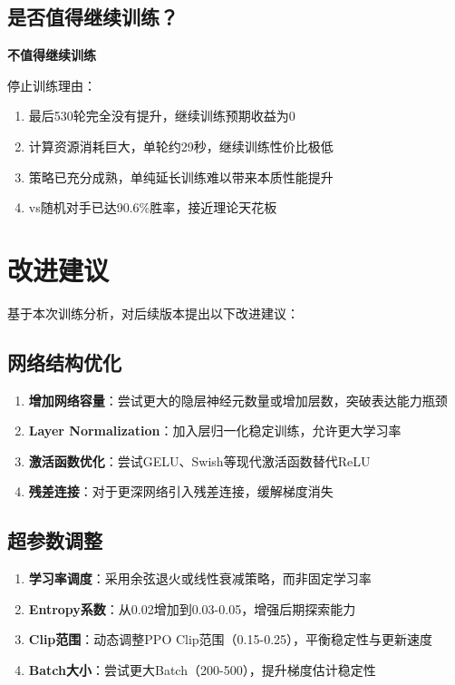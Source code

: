 \documentclass[12pt,a4paper]{article}
\begin{document}
\subsection{是否值得继续训练？}

\textcolor{danger}{\Huge \textbf{不值得继续训练}}

\vspace{0.5cm}

停止训练理由：
\begin{enumerate}
\item 最后530轮完全没有提升，继续训练预期收益为0
\item 计算资源消耗巨大，单轮约29秒，继续训练性价比极低
\item 策略已充分成熟，单纯延长训练难以带来本质性能提升
\item vs随机对手已达90.6\%胜率，接近理论天花板
\end{enumerate}

\newpage

\section{改进建议}

基于本次训练分析，对后续版本提出以下改进建议：

\subsection{网络结构优化}
\begin{enumerate}
\item \textbf{增加网络容量}：尝试更大的隐层神经元数量或增加层数，突破表达能力瓶颈
\item \textbf{Layer Normalization}：加入层归一化稳定训练，允许更大学习率
\item \textbf{激活函数优化}：尝试GELU、Swish等现代激活函数替代ReLU
\item \textbf{残差连接}：对于更深网络引入残差连接，缓解梯度消失
\end{enumerate}

\subsection{超参数调整}
\begin{enumerate}
\item \textbf{学习率调度}：采用余弦退火或线性衰减策略，而非固定学习率
\item \textbf{Entropy系数}：从0.02增加到0.03-0.05，增强后期探索能力
\item \textbf{Clip范围}：动态调整PPO Clip范围（0.15-0.25），平衡稳定性与更新速度
\item \textbf{Batch大小}：尝试更大Batch（200-500），提升梯度估计稳定性
\end{enumerate}
\end{document}
